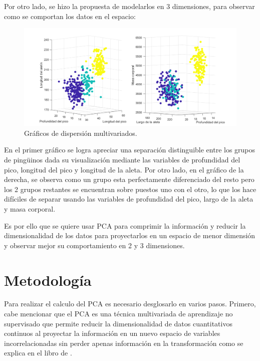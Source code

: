 \documentclass[11pt, letterpaper]{article}
\begin{document}
\newpage

Por otro lado, se hizo la propuesta de modelarlos en 3 dimensiones, para observar como se comportan los datos en el espacio:

\begin{figure}[h!]
	\centering
	\begin{minipage}{1.1\textwidth}
		\centering
		\includegraphics[width=\textwidth]{IMG/G2.png}
		\caption{Gráficos de dispersión multivariados.}
		\label{fig:f3}
	\end{minipage}\hfill
\end{figure}


En el primer gráfico se logra apreciar una separación distinguible entre los grupos de pingüinos dada su visualización mediante las variables de profundidad del pico, longitud del pico y longitud de la aleta. Por otro lado, en el gráfico de la derecha, se observa como un grupo esta perfectamente diferenciado del resto pero los 2 grupos restantes se encuentran sobre puestos uno con el otro, lo que los hace difíciles de separar usando las variables de profundidad del pico, largo de la aleta y masa corporal.

Es por ello que se quiere usar PCA para comprimir la información y reducir la dimensionalidad de los datos para proyectarlos en un espacio de menor dimensión y observar mejor su comportamiento en 2 y 3 dimensiones.

	
	\newpage
	
	\section{Metodología}
	
	Para realizar el calculo del PCA es necesario desglosarlo en varios pasos. Primero, cabe mencionar que el PCA es una técnica multivariada de aprendizaje no supervisado que permite reducir la dimensionalidad de datos cuantitativos continuos al proyectar la información en un nuevo espacio de variables incorrelacionadas sin perder apenas información en la transformación como se explica en el libro de \cite{johnson2007}. 
	
\end{document}
